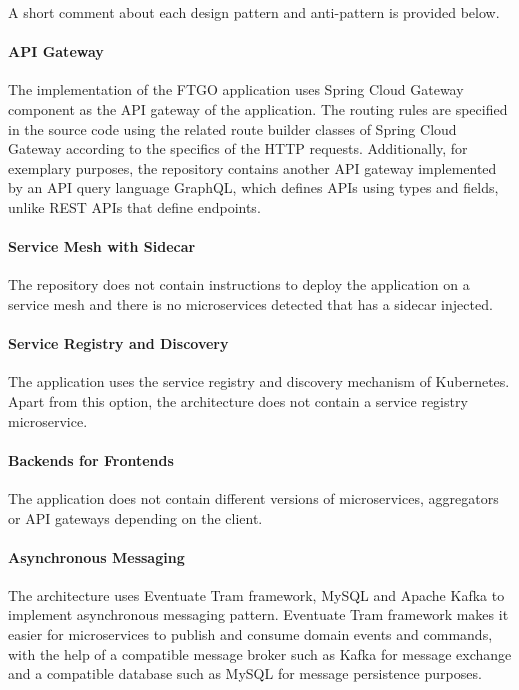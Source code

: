 \documentclass{Configuration_Files/PoliMi3i_thesis}
\begin{document}
A short comment about each design pattern and anti-pattern is provided below.

\paragraph{API Gateway} The implementation of the FTGO application uses Spring Cloud Gateway\footnotemark[90] component as the API gateway of the application.
The routing rules are specified in the source code using the related route builder classes of Spring Cloud Gateway according to the specifics of the HTTP requests.
Additionally, for exemplary purposes, the repository contains another API gateway implemented by an API query language GraphQL\footnotemark[91], which defines APIs using types and fields, unlike REST APIs that define endpoints.

\paragraph{Service Mesh with Sidecar} The repository does not contain instructions to deploy the application on a service mesh and there is no microservices detected that has a sidecar injected.

\paragraph{Service Registry and Discovery} The application uses the service registry and discovery mechanism of Kubernetes.
Apart from this option, the architecture does not contain a service registry microservice.

\paragraph{Backends for Frontends} The application does not contain different versions of microservices, aggregators or API gateways depending on the client.

\paragraph{Asynchronous Messaging} The architecture uses Eventuate Tram framework, MySQL and Apache Kafka to implement asynchronous messaging pattern.
Eventuate Tram framework makes it easier for microservices to publish and consume domain events and commands, with the help of a compatible message broker such as Kafka for message exchange and a compatible database such as MySQL for message persistence purposes.
\end{document}
